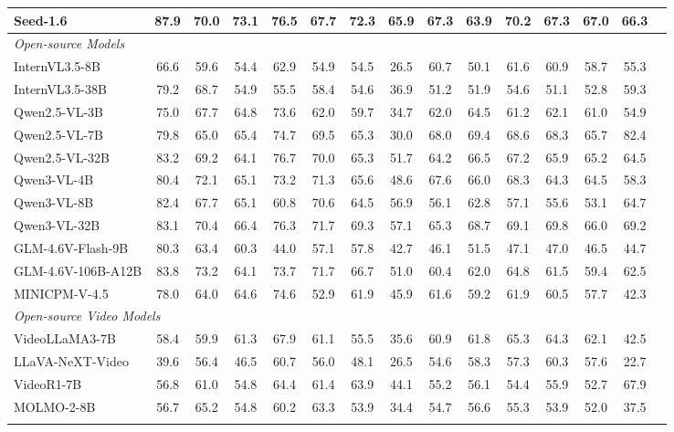 \begin{table}[t]
{\begin{tabular}{l | cc | ccccc | cccccc | c}
Seed-1.6 & 87.9 & 70.0 & 73.1 & 76.5 & 67.7 & 72.3 & 65.9 & 67.3 & 63.9 & 70.2 & 67.3 & 67.0 & 66.3 & \cellcolor{gray!15}{70.4} \\
\hline
\multicolumn{15}{l}{\emph{Open-source Models}} \\
InternVL3.5-8B & 66.6 & 59.6 & 54.4 & 62.9 & 54.9 & 54.5 & 26.5 & 60.7 & 50.1 & 61.6 & 60.9 & 58.7 & 55.3 & \cellcolor{gray!15}{55.9} \\
InternVL3.5-38B & 79.2 & 68.7 & 54.9 & 55.5 & 58.4 & 54.6 & 36.9 & 51.2 & 51.9 & 54.6 & 51.1 & 52.8 & 59.3 & \cellcolor{gray!15}{56.1} \\
Qwen2.5-VL-3B & 75.0 & 67.7 & 64.8 & 73.6 & 62.0 & 59.7 & 34.7 & 62.0 & 64.5 & 61.2 & 62.1 & 61.0 & 54.9 & \cellcolor{gray!15}{61.8} \\
Qwen2.5-VL-7B & 79.8 & 65.0 & 65.4 & 74.7 & 69.5 & 65.3 & 30.0 & 68.0 & 69.4 & 68.6 & 68.3 & 65.7 & 82.4 & \cellcolor{gray!15}{67.1} \\
Qwen2.5-VL-32B & 83.2 & 69.2 & 64.1 & 76.7 & 70.0 & 65.3 & 51.7 & 64.2 & 66.5 & 67.2 & 65.9 & 65.2 & 64.5 & \cellcolor{gray!15}{67.2} \\
Qwen3-VL-4B & 80.4 & 72.1 & 65.1 & 73.2 & 71.3 & 65.6 & 48.6 & 67.6 & 66.0 & 68.3 & 64.3 & 64.5 & 58.3 & \cellcolor{gray!15}{66.6} \\
Qwen3-VL-8B & 82.4 & 67.7 & 65.1 & 60.8 & 70.6 & 64.5 & 56.9 & 56.1 & 62.8 & 57.1 & 55.6 & 53.1 & 64.7 & \cellcolor{gray!15}{62.9} \\
Qwen3-VL-32B & 83.1 & 70.4 & 66.4 & 76.3 & 71.7 & 69.3 & 57.1 & 65.3 & 68.7 & 69.1 & 69.8 & 66.0 & 69.2 & \cellcolor{gray!15}{69.4} \\
GLM-4.6V-Flash-9B & 80.3 & 63.4 & 60.3 & 44.0 & 57.1 & 57.8 & 42.7 & 46.1 & 51.5 & 47.1 & 47.0 & 46.5 & 44.7 & \cellcolor{gray!15}{53.0} \\
GLM-4.6V-106B-A12B & 83.8 & 73.2 & 64.1 & 73.7 & 71.7 & 66.7 & 51.0 & 60.4 & 62.0 & 64.8 & 61.5 & 59.4 & 62.5 & \cellcolor{gray!15}{65.8} \\
MINICPM-V-4.5 & 78.0 & 64.0 & 64.6 & 74.6 & 52.9 & 61.9 & 45.9 & 61.6 & 59.2 & 61.9 & 60.5 & 57.7 & 42.3 & \cellcolor{gray!15}{60.4} \\
\hline
\multicolumn{15}{l}{\emph{Open-source Video Models}} \\
VideoLLaMA3-7B & 58.4 & 59.9 & 61.3 & 67.9 & 61.1 & 55.5 & 35.6 & 60.9 & 61.8 & 65.3 & 64.3 & 62.1 & 42.5 & \cellcolor{gray!15}{58.2} \\
LLaVA-NeXT-Video & 39.6 & 56.4 & 46.5 & 60.7 & 56.0 & 48.1 & 26.5 & 54.6 & 58.3 & 57.3 & 60.3 & 57.6 & 22.7 & \cellcolor{gray!15}{49.6} \\
VideoR1-7B & 56.8 & 61.0 & 54.8 & 64.4 & 61.4 & 63.9 & 44.1 & 55.2 & 56.1 & 54.4 & 55.9 & 52.7 & 67.9 & \cellcolor{gray!15}{57.6} \\
MOLMO-2-8B & 56.7 & 65.2 & 54.8 & 60.2 & 63.3 & 53.9 & 34.4 & 54.7 & 56.6 & 55.3 & 53.9 & 52.0 & 37.5 & \cellcolor{gray!15}{53.7} \\
\hline
\Xhline{1pt}
\end{tabular}
}
\end{table}


